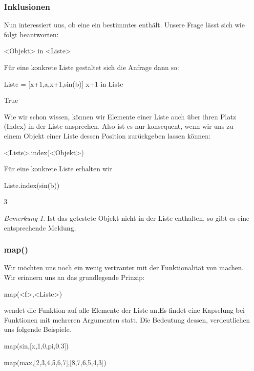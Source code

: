 \documentclass[fontsize=12pt,paper=a4,twoside,bibtotoc,idxtotoc,
liststotoc,pagesize,BCOR1.2cm,DIV15,chapterprefix,pagesize=pdftex]{scrbook}
\theoremstyle{plain}
\theoremstyle{definition}
\theoremstyle{remark}
\newtheorem{bem}[equation]{Bemerkung}
\begin{document}
\subsubsection{Inklusionen}
Nun interessiert uns, ob eine  ein bestimmtes  enthält. Unsere Frage lässt sich wie folgt beantworten:
\begin{sagein}
 <Objekt> in <Liste>
\end{sagein}
Für eine konkrete Liste gestaltet sich die Anfrage dann so:
\begin{sagein}
Liste = [x+1,a,x+1,sin(b)]
x+1 in Liste
\end{sagein}
\begin{sage}
  True
\end{sage}
Wie wir schon wissen, können wir Elemente einer Liste auch über ihren Platz (Index) in der Liste ansprechen. Also ist es nur konsequent, wenn wir uns zu einem Objekt einer Liste 
dessen Position zurückgeben lassen können:
\begin{sagein}
 <Liste>.index(<Objekt>)
\end{sagein}
Für eine konkrete Liste erhalten wir
\begin{sagein}
Liste.index(sin(b))
\end{sagein}
\begin{sage}
  3
\end{sage}
\begin{bem}
 Ist das getestete Objekt nicht in der Liste enthalten, so gibt es eine entsprechende Meldung.
\end{bem}
\subsubsection{map()} 
Wir möchten uns noch ein wenig vertrauter mit der Funktionalität von  machen. Wir erinnern uns an das grundlegende Prinzip:
\begin{sagein}
 map(<f>,<Liste>)
\end{sagein}
 wendet die Funktion  auf alle Elemente der Liste  an.Es findet eine Kapselung bei Funktionen mit mehreren Argumenten statt. Die Bedeutung dessen, 
verdeutlichen uns folgende Beispiele.
\begin{sagein}
map(sin,[x,1,0,pi,0.3])
\end{sagein}
\begin{sage}
\end{sage}
\begin{sagein}
map(max,[2,3,4,5,6,7],[8,7,6,5,4,3])
\end{sagein}
\begin{sage}
[8, 7, 6, 5, 6, 7]
\end{sage}
\end{document}
